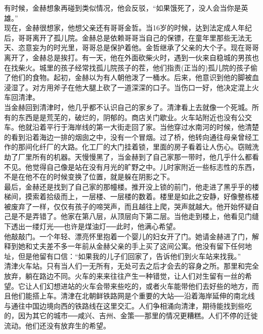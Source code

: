 有时候，金赫想象再碰到类似情况，他会反驳，“如果饿死了，没人会当你是英雄。”\\

现在，金赫很想家，他想父亲还有哥哥金哲。当16岁的时候，达到法定成人年纪后，哥哥离开了孤儿院。金赫总是依赖哥哥当自己的保镖，在童年里那些无法无天、恣意妄为的时光里，哥哥总是保护着他。金哲继承了父亲的大个子。现在哥哥离开了，金赫总是挨打。有一天，他在外面砍柴火时，遇到一伙来自稳城的男孩也在找柴火。城里的孩子经常找孤儿院孩子的茬，他们指责(正当的)孤儿院的孩子偷了他们的食物。起初，金赫以为有人朝他泼了一桶水。后来，他意识到他的脚被血浸湿了。对方用斧子在他大腿上砍了一道深深的口子。当伤口一好，他决定混上火车回清津。\\

当金赫回到清津时，他几乎都不认识自己的家乡了。清津看上去就像一个死城。所有的东西是是荒芜的，破烂的，阴郁的。商店关门歇业。火车站附近也没有公交车。他就沿着平行于海岸线的第一大街走回了家。当他穿过水南河的时候，他清楚的看到沿着海边一排的烟囱之中，没有一个冒烟。过了桥，他转向通往母亲曾经工作的那间化纤厂的大路。化工厂的大门挂着锁，里面的房子看着让人伤心。窃贼洗劫了厂里所有的机器。天慢慢黑了，当金赫到了自己家那一带时，他几乎什么都看不见。他觉得自己像是站在没有月光的旷野之中。儿时家附近一些标志性的东西，不是在他不在的时候变换了位置，就是躲在阴影之下。\\

最后，金赫还是找到了自己家的那幢楼。推开没上锁的前门，他走进了黑乎乎的楼梯间，摸索着拾级而上，一层楼、一层楼的数着。楼里是如此之安静，好像整栋楼被废弃了一样，仅仅有孩子的啼哭声，而且越往上爬，哭声就越大。他开始怀疑自己是不是弄错了。他家在第八层，从顶层向下第二层。当他走到楼上，他看见门缝下透出一缕灯光──也许是煤油灯──此时，他满心希望。\\

他敲敲门。一个年轻、漂亮怀里抱着一个婴儿的妇女开了门。她请金赫进了门，解释到她和丈夫差不多一年前从金赫父亲的手上买了这间公寓。他没有留下任何地址，但是他留有口信：“如果我的儿子们回家了，告诉他们到火车站来找我。”\\

清津火车站。只有当人们一无所有，无处可去之后才会去的容身之所。那里和完全放弃，躺在路边不同。火车的来来往往产生一种错觉，让人们对生留有一丝的希望。它让人们幻想进站的火车会带来些吃的，或者火车能带他们去好些的地方，而且他们能搭上车。清津在北朝鲜铁路网是个重要的大站──沿着海岸延伸的南北线与通往中国边境向西的铁路线在这里交汇。人们争相涌向清津，期待能找到些吃的，因为其它的城市──咸兴、吉州、金策──那里的情况更糟糕。人们不停的迁徙流动。他们还没有放弃生的希望。\\

